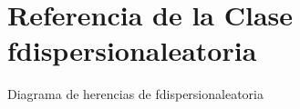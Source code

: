\hypertarget{classfdispersionaleatoria}{}\section{Referencia de la Clase fdispersionaleatoria}
\label{classfdispersionaleatoria}


Diagrama de herencias de fdispersionaleatoria
